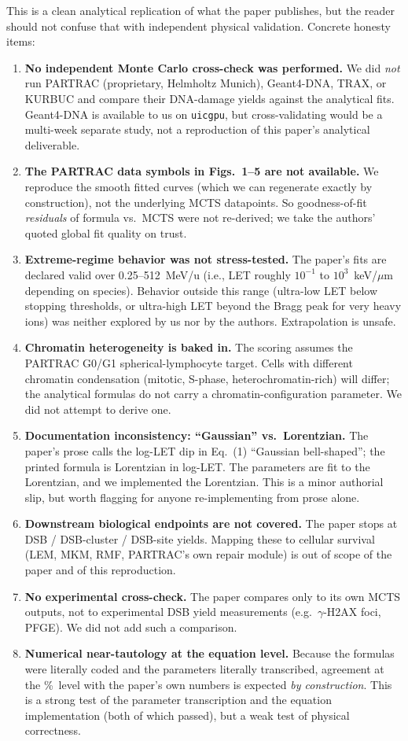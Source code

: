 \documentclass[11pt]{article}
\begin{document}
This is a clean analytical replication of what the paper publishes, but the reader should not confuse that with independent physical validation. Concrete honesty items:

\begin{enumerate}
  \item \textbf{No independent Monte Carlo cross-check was performed.} We did \emph{not} run PARTRAC (proprietary, Helmholtz Munich), Geant4-DNA, TRAX, or KURBUC and compare their DNA-damage yields against the analytical fits. Geant4-DNA is available to us on \texttt{uicgpu}, but cross-validating would be a multi-week separate study, not a reproduction of this paper's analytical deliverable.
  \item \textbf{The PARTRAC data symbols in Figs.~1--5 are not available.} We reproduce the smooth fitted curves (which we can regenerate exactly by construction), not the underlying MCTS datapoints. So goodness-of-fit \emph{residuals} of formula vs.\ MCTS were not re-derived; we take the authors' quoted global fit quality on trust.
  \item \textbf{Extreme-regime behavior was not stress-tested.} The paper's fits are declared valid over 0.25--512~MeV/u (i.e., LET roughly $10^{-1}$ to $10^{3}$~keV/$\mu$m depending on species). Behavior outside this range (ultra-low LET below stopping thresholds, or ultra-high LET beyond the Bragg peak for very heavy ions) was neither explored by us nor by the authors. Extrapolation is unsafe.
  \item \textbf{Chromatin heterogeneity is baked in.} The scoring assumes the PARTRAC G0/G1 spherical-lymphocyte target. Cells with different chromatin condensation (mitotic, S-phase, heterochromatin-rich) will differ; the analytical formulas do not carry a chromatin-configuration parameter. We did not attempt to derive one.
  \item \textbf{Documentation inconsistency: ``Gaussian'' vs.\ Lorentzian.} The paper's prose calls the log-LET dip in Eq.~(1) ``Gaussian bell-shaped''; the printed formula is Lorentzian in log-LET. The parameters are fit to the Lorentzian, and we implemented the Lorentzian. This is a minor authorial slip, but worth flagging for anyone re-implementing from prose alone.
  \item \textbf{Downstream biological endpoints are not covered.} The paper stops at DSB / DSB-cluster / DSB-site yields. Mapping these to cellular survival (LEM, MKM, RMF, PARTRAC's own repair module) is out of scope of the paper and of this reproduction.
  \item \textbf{No experimental cross-check.} The paper compares only to its own MCTS outputs, not to experimental DSB yield measurements (e.g.\ $\gamma$-H2AX foci, PFGE). We did not add such a comparison.
  \item \textbf{Numerical near-tautology at the equation level.} Because the formulas were literally coded and the parameters literally transcribed, agreement at the \%~level with the paper's own numbers is expected \emph{by construction}. This is a strong test of the parameter transcription and the equation implementation (both of which passed), but a weak test of physical correctness.
\end{enumerate}
\end{document}
